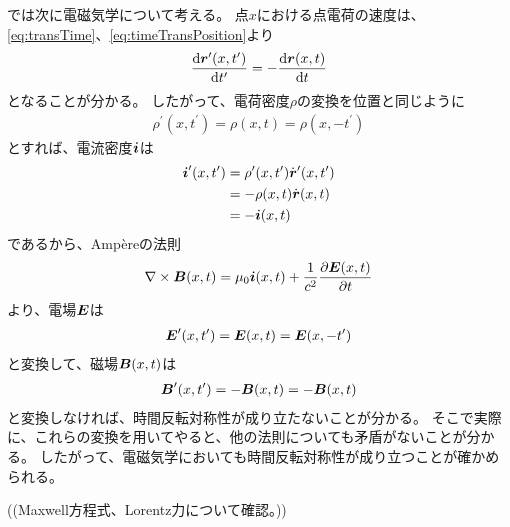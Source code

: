 \documentclass[a4paper]{jsarticle}
\def\vec#1{\mbox{\boldmath $#1$}}
\newcommand{\dif}[2]{\frac{{\rm d} #1}{{\rm d} #2}}
\newcommand{\pdif}[2]{\frac{\partial #1}{\partial #2}}
\begin{document}
では次に電磁気学について考える。
点$x$における点電荷の速度は、\eqref{eq:transTime}、\eqref{eq:timeTransPosition}より
\begin{align}
	\dif{\vec{r}^{\prime}(x, t^{\prime})}{t^{\prime}} = -\dif{\vec{r}(x, t)}{t}
\end{align}
となることが分かる。
したがって、電荷密度$\rho$の変換を位置と同じように
\begin{align}
	\rho^{\prime}(x, t^{\prime}) = \rho(x, t) = \rho(x, -t^{\prime})
\end{align}
とすれば、電流密度$\vec{i}$は
\begin{align}
	\vec{i}^{\prime}(x, t^{\prime})
	&= \rho^{\prime}(x, t^{\prime}) \dot{\vec{r}}^{\prime}(x, t^{\prime}) \\
	&= - \rho(x, t) \dot{\vec{r}}(x, t) \\
	&= -\vec{i}(x, t)
\end{align}
であるから、Amp\`{e}reの法則
\begin{align}
	\nabla \times \vec{B}(x, t) = \mu_0 \vec{i}(x, t) + \frac{1}{c^2} \pdif{\vec{E}(x, t)}{t}
\end{align}
より、電場$\vec{E}$は
\begin{align}
	\vec{E}^{\prime}(x, t^{\prime}) = \vec{E}(x, t) = \vec{E}(x, -t^{\prime})
\end{align}
と変換して、磁場$\vec{B}(x, t)$は
\begin{align}
	\vec{B}^{\prime}(x, t^{\prime}) = -\vec{B}(x, t) = -\vec{B}(x, t)
\end{align}
と変換しなければ、時間反転対称性が成り立たないことが分かる。
そこで実際に、これらの変換を用いてやると、他の法則についても矛盾がないことが分かる。
したがって、電磁気学においても時間反転対称性が成り立つことが確かめられる。

((Maxwell方程式、Lorentz力について確認。))
\end{document}
